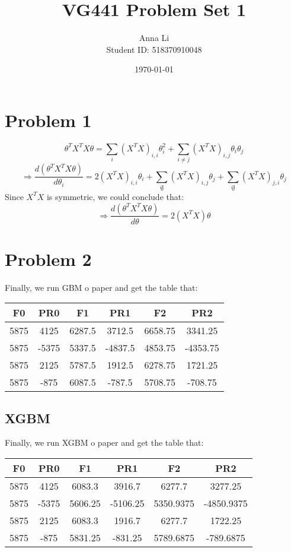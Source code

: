 \documentclass[a4paper,12pt]{journal}
\title{VG441 Problem Set 1}
\author{Anna Li \\Student ID: 518370910048}
\date{\today}
\begin{document}
	\maketitle
	\section*{Problem 1}
		$$\theta^TX^TX\theta=\sum_{i}(X^TX)_{i,i}\theta_i^2+\sum_{i\not =j}(X^TX)_{i,j}\theta_i\theta_j$$
	$$\Rightarrow \frac{d(\theta^TX^TX\theta)}{d\theta_i}=2(X^TX)_{i,i}\theta_i+\sum_{i\not j}(X^TX)_{i,j}\theta_j+\sum_{i\not j}(X^TX)_{j,i}\theta_j$$
	Since $X^TX$ is symmetric, we could conclude that:
	$$\Rightarrow \frac{d(\theta^TX^TX\theta)}{d\theta}=2(X^TX)\theta$$
	\section*{Problem 2}
	Finally, we run GBM o paper and get the table that:
	\begin{center}
		\begin{tabular}{|c|c|c|c|c|c|}
			\hline
			F0&PR0&F1&PR1&F2&PR2\\\hline
			5875&4125&6287.5&3712.5&6658.75&3341.25\\\hline
			5875&-5375&5337.5&-4837.5&4853.75&-4353.75\\\hline
			5875&2125&5787.5&1912.5&6278.75&1721.25\\\hline
			5875&-875&6087.5&-787.5&5708.75&-708.75\\\hline
		\end{tabular}
	\end{center}
	\subsection*{XGBM}
	Finally, we run XGBM o paper and get the table that:
	\begin{center}
		\begin{tabular}{|c|c|c|c|c|c|}
			\hline
			F0&PR0&F1&PR1&F2&PR2\\\hline
			5875&4125&6083.3&3916.7&6277.7&3277.25\\\hline
			5875&-5375&5606.25&-5106.25&5350.9375&-4850.9375\\\hline
			5875&2125&6083.3&1916.7&6277.7& 1722.25\\\hline
			5875&-875&5831.25&-831.25&5789.6875&-789.6875\\\hline
		\end{tabular}
	\end{center}
\end{document}
